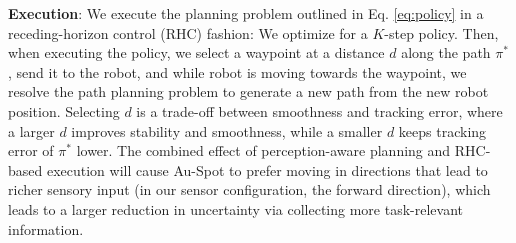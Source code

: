 \documentclass[letterpaper, 10pt, conference]{ieeeconf}      %
\newcommand{\ph}[1]{{\textbf{#1}:}} %
\newcommand{\rev}[1]{{\color{blue}#1}} %
\begin{document}



  

\ph{Execution}
We execute the planning problem outlined in Eq. \ref{eq:policy} in a receding-horizon control (RHC) fashion: We optimize for a $K$-step policy. Then, when executing the policy, we select a waypoint at a distance $d$ along the path $\pi^*$, send it to the robot, and while robot is moving towards the waypoint, we resolve the path planning problem to generate a new path from the new robot position. Selecting $d$ is a trade-off between smoothness and tracking error, where a larger $d$ improves stability and smoothness, while a smaller $d$ keeps tracking error of $\pi^*$ lower. \rev{The combined effect of perception-aware planning and RHC-based execution will cause Au-Spot to prefer moving in directions that lead to richer sensory input (in our sensor configuration, the forward direction), which leads to a larger reduction in uncertainty via collecting more task-relevant information.}


\end{document}
